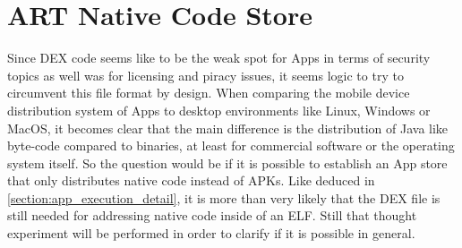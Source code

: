 \chapter{ART Native Code Store}\label{chapter:native_code_store}

Since DEX code seems like to be the weak spot for Apps in terms of security
topics as well was for licensing and piracy issues, it seems logic to try
to circumvent this file format by design.
When comparing the mobile device distribution
system of Apps to desktop environments like Linux, Windows or MacOS, it becomes
clear that the main difference is the distribution of Java like byte-code compared to binaries, at least for commercial software or the operating system itself. So the question would be if it is possible to establish an App store that only distributes native code instead of APKs. Like deduced in \autoref{section:app_execution_detail}, it is more than very likely that the DEX file is still needed for addressing native code inside of an ELF.
Still that thought experiment will be performed in order to clarify if it is possible in general.

